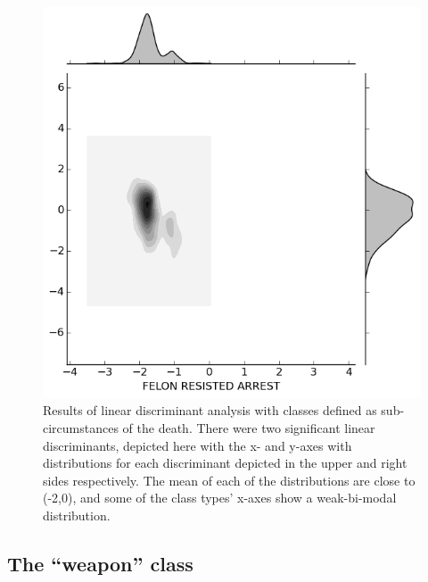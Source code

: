 \begin{figure}[H]
\begin{minipage}[b]{0.30\linewidth}
  \end{minipage}
  \quad
  \begin{minipage}[b]{0.30\linewidth}
    \includegraphics[width=\linewidth]{images/subcircum/FELON_RESISTED_ARREST.png}
  \end{minipage}
  \caption{Results of linear discriminant analysis with classes defined as sub-circumstances of the death.  There were two significant linear discriminants, depicted here with the x- and y-axes with distributions for each discriminant depicted in the upper and right sides respectively.  The mean of each of the distributions are close to (-2,0), and some of the class types' x-axes show a weak-bi-modal distribution.}
\end{figure}

\subsection{The ``weapon'' class}

